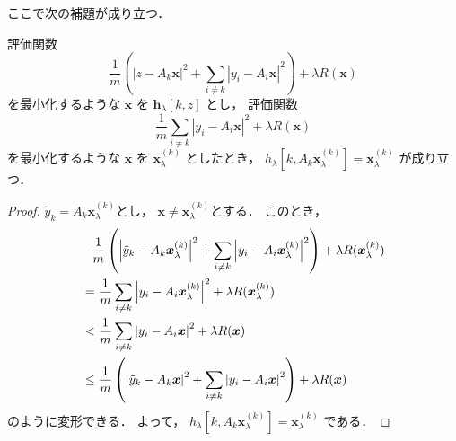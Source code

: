 ここで次の補題が成り立つ．
\begin{lemma}
    評価関数
    \begin{equation}
        \frac{1}{m} \left(\left|z - A_k \bm{x}\right|^2
        + \sum_{i \neq k} \left|y_i - A_i \bm{x}\right|^2\right)
        + \lambda R(\bm{x})
    \end{equation}
    を最小化するような $\bm{x}$ を $\bm{h}_\lambda[k,z]$ とし，
    評価関数
    \begin{equation}
        \frac{1}{m}
        \sum_{i \neq k} \left|y_i - A_i \bm{x}\right|^2
        + \lambda R(\bm{x})
    \end{equation}
    を最小化するような $\bm{x}$ を $\bm{x}_\lambda^{(k)}$ としたとき，
    $h_\lambda[k, A_k \bm{x}_\lambda^{(k)}] = \bm{x}_\lambda^{(k)}$
    が成り立つ．
\end{lemma}
\begin{proof}
    $\tilde{y}_k = A_k \bm{x}_\lambda^{(k)}$とし，
    $\bm{x} \neq \bm{x}_\lambda^{(k)}$とする．
    このとき，
    \begin{align}
         & \hphantom{=}
        \frac{1}{m} \left(\left|\tilde{y}_k - A_k \bm{x}_\lambda^{(k)}\right|^2
        + \sum_{i \neq k} \left|y_i - A_i \bm{x}_\lambda^{(k)}\right|^2\right)
        + \lambda R(\bm{x}_\lambda^{(k)})
        \notag                                                                         \\
         & = \frac{1}{m} \sum_{i \neq k} \left|y_i - A_i \bm{x}_\lambda^{(k)}\right|^2
        + \lambda R(\bm{x}_\lambda^{(k)})
        \notag                                                                         \\
         & < \frac{1}{m} \sum_{i \neq k} \left|y_i - A_i \bm{x}\right|^2
        + \lambda R(\bm{x})
        \notag                                                                         \\
         & \le \frac{1}{m} \left(\left|\tilde{y}_k - A_k \bm{x}\right|^2
        +\sum_{i \neq k} \left|y_i - A_i \bm{x}\right|^2\right)
        + \lambda R(\bm{x})
    \end{align}
    のように変形できる．
    よって，
    $h_\lambda[k, A_k \bm{x}_\lambda^{(k)}] = \bm{x}_\lambda^{(k)}$
    である．
\end{proof}

